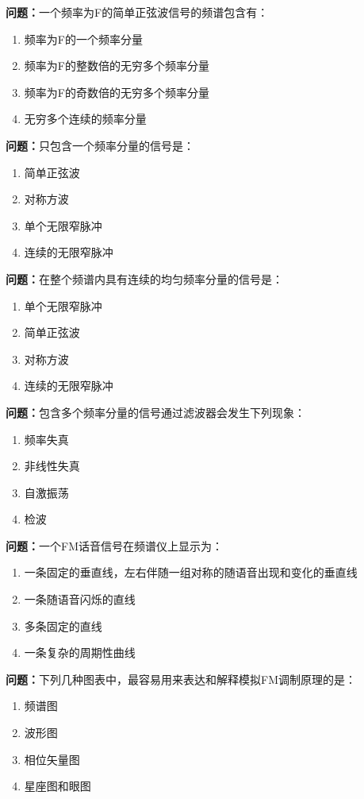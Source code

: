 \documentclass{ctexbook}%
\begin{document}
\textbf{问题：}一个频率为F的简单正弦波信号的频谱包含有：
\begin{enumerate}[label=\Alph*), leftmargin=3em]
\item 频率为F的一个频率分量
\item 频率为F的整数倍的无穷多个频率分量
\item 频率为F的奇数倍的无穷多个频率分量
\item 无穷多个连续的频率分量
\end{enumerate}

\textbf{问题：}只包含一个频率分量的信号是：
\begin{enumerate}[label=\Alph*), leftmargin=3em]
\item 简单正弦波
\item 对称方波
\item 单个无限窄脉冲
\item 连续的无限窄脉冲
\end{enumerate}

\textbf{问题：}在整个频谱内具有连续的均匀频率分量的信号是：
\begin{enumerate}[label=\Alph*), leftmargin=3em]
\item 单个无限窄脉冲
\item 简单正弦波
\item 对称方波
\item 连续的无限窄脉冲
\end{enumerate}

\textbf{问题：}包含多个频率分量的信号通过滤波器会发生下列现象：
\begin{enumerate}[label=\Alph*), leftmargin=3em]
\item 频率失真
\item 非线性失真
\item 自激振荡
\item 检波
\end{enumerate}

\textbf{问题：}一个FM话音信号在频谱仪上显示为：
\begin{enumerate}[label=\Alph*), leftmargin=3em]
\item 一条固定的垂直线，左右伴随一组对称的随语音出现和变化的垂直线
\item 一条随语音闪烁的直线
\item 多条固定的直线
\item 一条复杂的周期性曲线
\end{enumerate}

\textbf{问题：}下列几种图表中，最容易用来表达和解释模拟FM调制原理的是：
\begin{enumerate}[label=\Alph*), leftmargin=3em]
\item 频谱图
\item 波形图
\item 相位矢量图
\item 星座图和眼图
\end{enumerate}
\end{document}
